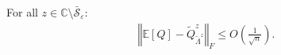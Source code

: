 \documentclass{ws-rmta}
\DeclareMathOperator{\tr}{Tr}
\begin{document}
\begin{proposition}\label{pro:deuxième équivalent déterministe}
  For all $z \in \mathbb C \setminus \bar{\mathcal S}_\varepsilon$:
  \begin{align*}
    \left\Vert \mathbb E[Q] - \tilde Q^z_{\tilde \Lambda^z} \right\Vert_F \leq O \left( \frac{1}{\sqrt n} \right).
  \end{align*}
\end{proposition}
\end{document}

